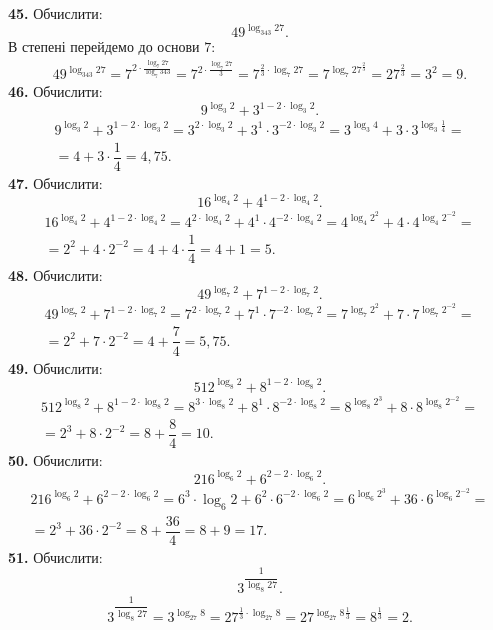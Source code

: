 \textbf{45.} Обчислити:
$$
49^{\log_{343}27}.
$$
В степені перейдемо до основи $7$:
\begin{multline*}
49^{\log_{343}27}=
7^{2\cdot\frac{\log_{7}27}{\log_{7}343}}=
7^{2\cdot\frac{\log_{7}27}{3}}=
7^{\frac{2}{3}\cdot\log_{7}27}=
7^{\log_{7}27^{\frac{2}{3}}}=
27^{\frac{2}{3}}=3^2=9.
\end{multline*}
\textbf{46.} Обчислити:
$$
9^{\log_{3}2}+3^{1-2\cdot\log_{3}2}.
$$
\begin{multline*}
9^{\log_{3}2}+3^{1-2\cdot\log_{3}2}=
3^{2\cdot\log_{3}2}+3^1\cdot3^{-2\cdot\log_{3}2} =
3^{\log_{3}4}+3\cdot3^{\log_{3}\frac{1}{4}} =\\
=4+3\cdot\dfrac{1}{4}=4,75.
\end{multline*}
\textbf{47.} Обчислити:
$$
16^{\log_{4}2}+4^{1-2\cdot\log_{4}2}.
$$
\begin{multline*}
16^{\log_{4}2}+4^{1-2\cdot\log_{4}2}=
4^{2\cdot\log_{4}2}+4^1\cdot4^{-2\cdot\log_{4}2}=
4^{\log_{4}2^2}+4\cdot4^{\log_{4}2^{-2}}=\\
=2^2+4\cdot2^{-2}=4+4\cdot\dfrac{1}{4}=4+1=5.
\end{multline*}
\textbf{48.} Обчислити:
$$
49^{\log_{7}2}+7^{1-2\cdot\log_{7}2}.
$$
\begin{multline*}
49^{\log_{7}2}+7^{1-2\cdot\log_{7}2}=
7^{2\cdot\log_{7}2}+7^1\cdot7^{-2\cdot\log_{7}2}=
7^{\log_{7}2^2}+7\cdot7^{\log_{7}2^{-2}}=\\
=2^2+7\cdot2^{-2}=
4+\dfrac{7}{4}=5,75.
\end{multline*}
\textbf{49.} Обчислити:
$$
512^{\log_{8}2}+8^{1-2\cdot\log_{8}2}.
$$
\begin{multline*}
512^{\log_{8}2}+8^{1-2\cdot\log_{8}2}=
8^{3\cdot\log_{8}2}+8^1\cdot8^{-2\cdot\log_{8}2}=
8^{\log_{8}2^3}+8\cdot8^{\log_{8}2^{-2}}=\\
=2^3+8\cdot2^{-2}=
8+\dfrac{8}{4}=10.
\end{multline*}
\textbf{50.} Обчислити:
$$
216^{\log_{6}2}+6^{2-2\cdot\log_{6}2}.
$$
\begin{multline*}
216^{\log_{6}2}+6^{2-2\cdot\log_{6}2}=
6^3\cdot\log_{6}2+6^{2}\cdot6^{-2\cdot\log_{6}2}=
6^{\log_{6}2^3}+36\cdot6^{\log_{6}2^{-2}}=\\
=2^3+36\cdot2^{-2}=
8+\dfrac{36}{4}=8+9=17.
\end{multline*}
\textbf{51.} Обчислити:
$$
3^{\dfrac{1}{\log_{8}27}}.
$$
\begin{gather*}
3^{\dfrac{1}{\log_{8}27}}=
3^{\log_{27}8}=
27^{\frac{1}{3}\cdot\log_{27}8}=
27^{\log_{27}8^{}\frac{1}{3}}=
8^{\frac{1}{3}}=2.
\end{gather*}
